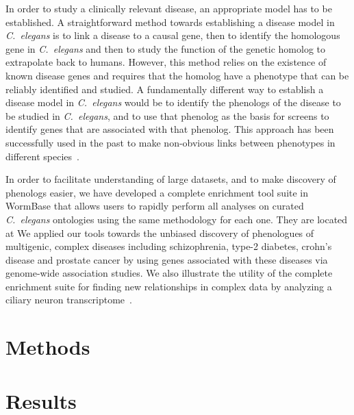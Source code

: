 \documentclass[10pt,letterpaper,twocolumn]{article}
\newcommand{\cel}{\emph{C.~elegans}}
\begin{document}
In order to study a clinically relevant disease, an appropriate model has to be
established. A straightforward method towards establishing a disease model in
\cel{} is to link a disease to a causal gene, then to identify the homologous
gene in \cel{} and then to study the function of the genetic homolog to
extrapolate back to humans. However, this method relies on the existence of
known disease genes and requires that the homolog have a phenotype that can be
reliably identified and studied. A fundamentally different way to establish a
disease model in \cel{} would be to identify the phenologs of the disease to be
studied in \cel{}, and to use that phenolog as the basis for screens to identify
genes that are associated with that phenolog. This approach has been
successfully used in the past to make non-obvious links between phenotypes in
different species~\cite{}.

In order to facilitate understanding of large datasets, and to make discovery of
phenologs easier, we have developed a complete enrichment tool suite in WormBase
that allows users to rapidly perform all analyses on curated \cel{} ontologies
using the same methodology for each one. They are located at
We applied our tools towards the unbiased discovery of phenologues of
multigenic, complex diseases including schizophrenia, type-2 diabetes,
crohn's disease and prostate cancer by using genes associated with these
diseases via genome-wide association studies. We also illustrate the utility of
the complete enrichment suite for finding new relationships in complex data by
analyzing a ciliary neuron transcriptome~\cite{}.

\section*{Methods}


\section*{Results}
\end{document}
